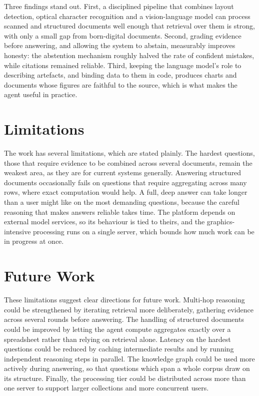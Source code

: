 Three findings stand out. First, a disciplined pipeline that combines layout
detection, optical character recognition and a vision-language model can process
scanned and structured documents well enough that retrieval over them is strong,
with only a small gap from born-digital documents. Second, grading evidence before
answering, and allowing the system to abstain, measurably improves honesty: the
abstention mechanism roughly halved the rate of confident mistakes, while
citations remained reliable. Third, keeping the language model's role to describing
artefacts, and binding data to them in code, produces charts and documents whose
figures are faithful to the source, which is what makes the agent useful in
practice.

\section{Limitations}

The work has several limitations, which are stated plainly. The hardest questions,
those that require evidence to be combined across several documents, remain the
weakest area, as they are for current systems generally. Answering structured
documents occasionally fails on questions that require aggregating across many
rows, where exact computation would help. A full, deep answer can take longer than
a user might like on the most demanding questions, because the careful reasoning
that makes answers reliable takes time. The platform depends on external model
services, so its behaviour is tied to theirs, and the graphics-intensive processing
runs on a single server, which bounds how much work can be in progress at once.

\section{Future Work}

These limitations suggest clear directions for future work. Multi-hop reasoning
could be strengthened by iterating retrieval more deliberately, gathering evidence
across several rounds before answering. The handling of structured documents could
be improved by letting the agent compute aggregates exactly over a spreadsheet
rather than relying on retrieval alone. Latency on the hardest questions could be
reduced by caching intermediate results and by running independent reasoning steps
in parallel. The knowledge graph could be used more actively during answering, so
that questions which span a whole corpus draw on its structure. Finally, the
processing tier could be distributed across more than one server to support larger
collections and more concurrent users.

